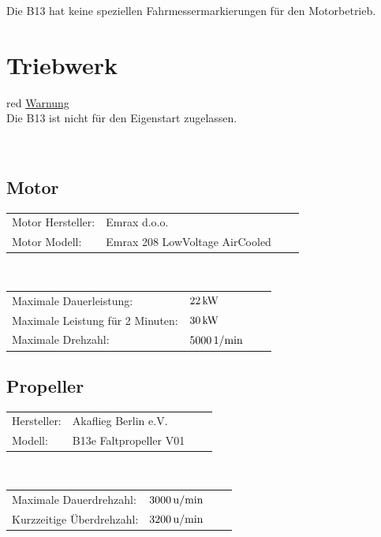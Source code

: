 \vspace{0.2cm}
Die B13 hat keine speziellen Fahrmessermarkierungen für den Motorbetrieb.
\newpage
\section{Triebwerk}
\begin{color}{red}
\large{\underline{Warnung}}\\
Die B13 ist nicht für den Eigenstart zugelassen.
\end{color}\\

\subsection{Motor}
\begin{tabular}{p{}p{}ll}
Motor Hersteller: & Emrax d.o.o.\\
Motor Modell: & Emrax 208 LowVoltage AirCooled\\
\end{tabular}\\

\vspace{0.2cm}
\begin{tabular}{p{}p{}ll}
Maximale Dauerleistung: & $\unit[22]{kW}$\\
Maximale Leistung für 2 Minuten: & $\unit[30]{kW}$\\
Maximale Drehzahl: & $\unit[5000]{1/min}$
\end{tabular}

\subsection{Propeller}
\begin{tabular}{p{}p{}ll}
Hersteller: & Akaflieg Berlin e.V. \\
Modell: & B13e Faltpropeller V01 \\
\end{tabular}\\

\vspace{0.2cm}
\begin{tabular}{p{}p{}ll}
Maximale Dauerdrehzahl: & $\unit[3000]{u/min}$ \\
Kurzzeitige Überdrehzahl: & $\unit[3200]{u/min}$ \\
\end{tabular}

